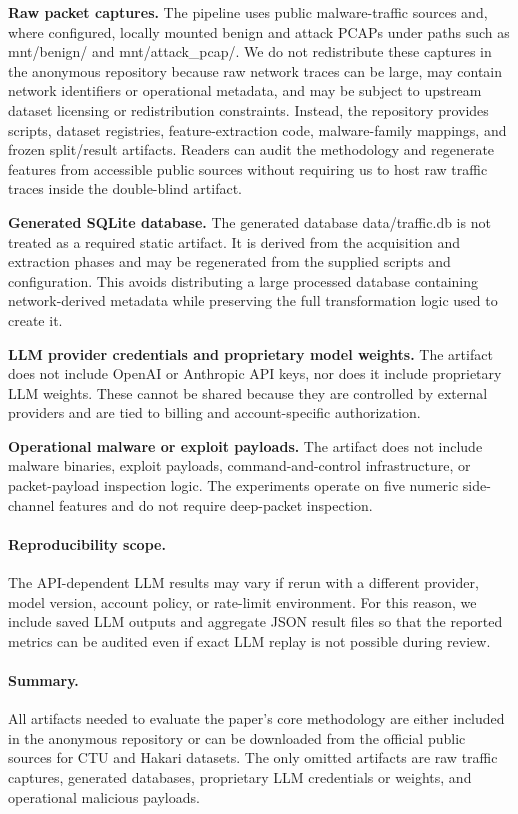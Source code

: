 \documentclass[conference]{IEEEtran}
\begin{document}
\textbf{Raw packet captures.}
The pipeline uses public malware-traffic sources and, where configured, locally mounted benign and attack PCAPs under paths such as mnt/benign/ and mnt/attack\_pcap/. We do not redistribute these captures in the anonymous repository because raw network traces can be large, may contain network identifiers or operational metadata, and may be subject to upstream dataset licensing or redistribution constraints. Instead, the repository provides scripts, dataset registries, feature-extraction code, malware-family mappings, and frozen split/result artifacts. Readers can audit the methodology and regenerate features from accessible public sources without requiring us to host raw traffic traces inside the double-blind artifact.

\textbf{Generated SQLite database.}
The generated database data/traffic.db is not treated as a required static artifact. It is derived from the acquisition and extraction phases and may be regenerated from the supplied scripts and configuration. This avoids distributing a large processed database containing network-derived metadata while preserving the full transformation logic used to create it.

\textbf{LLM provider credentials and proprietary model weights.}
The artifact does not include OpenAI or Anthropic API keys, nor does it include proprietary LLM weights. These cannot be shared because they are controlled by external providers and are tied to billing and account-specific authorization.

\textbf{Operational malware or exploit payloads.}
The artifact does not include malware binaries, exploit payloads, command-and-control infrastructure, or packet-payload inspection logic. The experiments operate on five numeric side-channel features and do not require deep-packet inspection. 

\paragraph{Reproducibility scope.}
The API-dependent LLM results may vary if rerun with a different provider, model version, account policy, or rate-limit environment. For this reason, we include saved LLM outputs and aggregate JSON result files so that the reported metrics can be audited even if exact LLM replay is not possible during review.

\paragraph{Summary.}
All artifacts needed to evaluate the paper's core methodology are either included in the anonymous repository or can be downloaded from the official public sources for CTU and Hakari datasets. The only omitted artifacts are raw traffic captures, generated databases, proprietary LLM credentials or weights, and operational malicious payloads.
\end{document}
